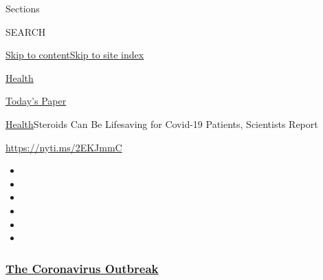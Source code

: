 Sections

SEARCH

\protect\hyperlink{site-content}{Skip to
content}\protect\hyperlink{site-index}{Skip to site index}

\href{https://www.nytimes3xbfgragh.onion/section/health}{Health}

\href{https://myaccount.nytimes3xbfgragh.onion/auth/login?response_type=cookie\&client_id=vi}{}

\href{https://www.nytimes3xbfgragh.onion/section/todayspaper}{Today's
Paper}

\href{/section/health}{Health}\textbar{}Steroids Can Be Lifesaving for
Covid-19 Patients, Scientists Report

\url{https://nyti.ms/2EKJmmC}

\begin{itemize}
\item
\item
\item
\item
\item
\item
\end{itemize}

\hypertarget{the-coronavirus-outbreak}{%
\subsubsection{\texorpdfstring{\href{https://www.nytimes3xbfgragh.onion/news-event/coronavirus?name=styln-coronavirus-national\&region=TOP_BANNER\&block=storyline_menu_recirc\&action=click\&pgtype=Article\&impression_id=80393a70-f4ba-11ea-9f52-359fb3db6407\&variant=undefined}{The
Coronavirus
Outbreak}}{The Coronavirus Outbreak}}\label{the-coronavirus-outbreak}}

